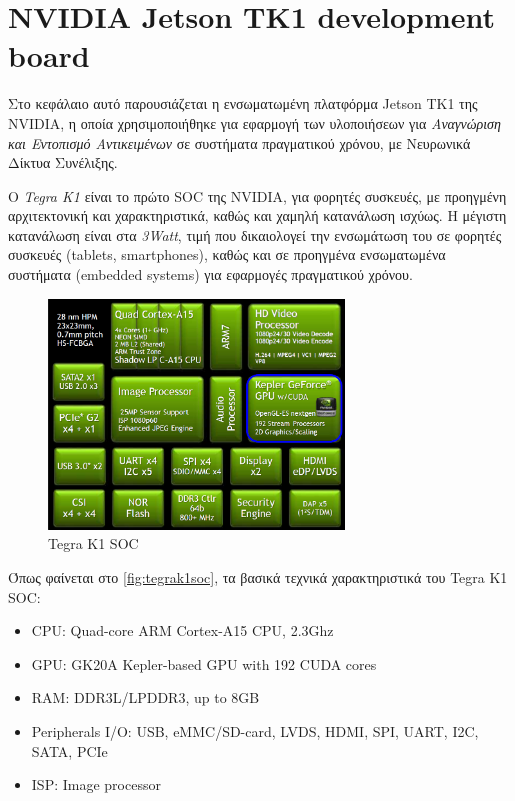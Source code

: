 \section{NVIDIA Jetson TK1 development board}
\label{sec:jetson_tk1}

Στο κεφάλαιο αυτό παρουσιάζεται η ενσωματωμένη πλατφόρμα Jetson TK1 της NVIDIA,
η οποία χρησιμοποιήθηκε για εφαρμογή των υλοποιήσεων για
\emph{Αναγνώριση και Εντοπισμό Αντικειμένων} σε συστήματα πραγματικού χρόνου,
με Νευρωνικά Δίκτυα Συνέλιξης.

Ο \emph{Tegra K1} είναι το πρώτο SOC της NVIDIA, για φορητές συσκευές, με προηγμένη αρχιτεκτονική
και χαρακτηριστικά, καθώς και χαμηλή κατανάλωση ισχύως. H μέγιστη κατανάλωση είναι στα \emph{3Watt},
τιμή που δικαιολογεί την ενσωμάτωση του σε φορητές συσκευές (tablets, smartphones), καθώς και
σε προηγμένα ενσωματωμένα συστήματα (embedded systems) για εφαρμογές πραγματικού χρόνου.
\begin{figure}[H]
  \centering
  \includegraphics[width=0.7\textwidth]{./images/chapter4/nvidia_tegrak1_block2.jpg}
  \caption{Tegra K1 SOC}
  \label{fig:tegrak1soc}
\end{figure}
\noindent
Όπως φαίνεται στο \autoref{fig:tegrak1soc}, τα βασικά τεχνικά χαρακτηριστικά του Tegra K1 SOC:
\begin{itemize}
  \item{CPU: Quad-core ARM Cortex-A15 CPU, 2.3Ghz}
  \item{GPU: GK20A Kepler-based GPU with 192 CUDA cores}
  \item{RAM: DDR3L/LPDDR3, up to 8GB}
  \item{Peripherals I/O: USB, eMMC/SD-card, LVDS, HDMI, SPI, UART, I2C, SATA, PCIe}
  \item{ISP: Image processor}
\end{itemize}

